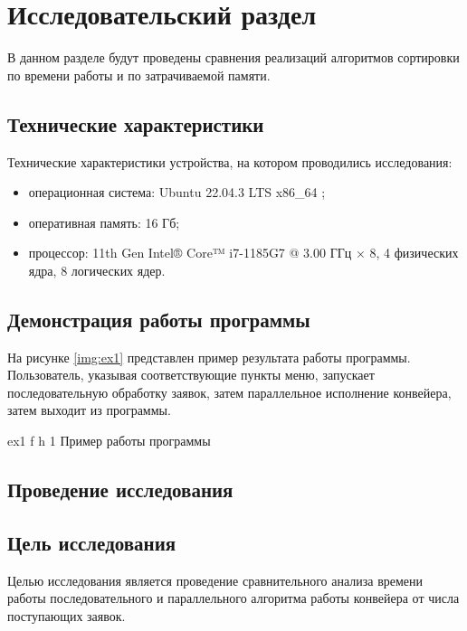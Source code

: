 \chapter{Исследовательский раздел}

В данном разделе будут проведены сравнения реализаций алгоритмов сортировки  по времени работы и по затрачиваемой памяти.

\section{Технические характеристики}

Технические характеристики устройства, на котором проводились исследования: 

\begin{itemize}[label=--]
	\item операционная система: Ubuntu 22.04.3 LTS x86\_64 \cite{info_os};
	\item оперативная память: 16 Гб;
	\item процессор: 11th Gen Intel® Core™ i7-1185G7 @ 3.00 ГГц × 8, 4 физических ядра, 8 логических ядер.
\end{itemize}

\section{Демонстрация работы программы}

На рисунке \ref{img:ex1} представлен пример результата работы программы. Пользователь, указывая соответствующие пункты меню, запускает последовательную обработку заявок, затем параллельное исполнение конвейера, затем выходит из программы.

\clearpage

{ex1} %
{f} %
{h} %
{1\textwidth} %
{Пример работы программы} %

\section{Проведение исследования}

\section*{Цель исследования}

Целью исследования является проведение сравнительного анализа времени работы последовательного и параллельного алгоритма работы конвейера от числа поступающих заявок.

